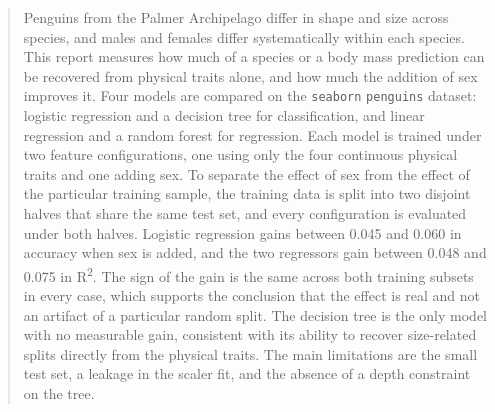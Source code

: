 \begin{abstract}
	Penguins from the Palmer Archipelago differ in shape and size across species, and males and females differ systematically within each species. This report measures how much of a species or a body mass prediction can be recovered from physical traits alone, and how much the addition of sex improves it. Four models are compared on the \texttt{seaborn} \texttt{penguins} dataset: logistic regression and a decision tree for classification, and linear regression and a random forest for regression. Each model is trained under two feature configurations, one using only the four continuous physical traits and one adding sex. To separate the effect of sex from the effect of the particular training sample, the training data is split into two disjoint halves that share the same test set, and every configuration is evaluated under both halves. Logistic regression gains between 0.045 and 0.060 in accuracy when sex is added, and the two regressors gain between 0.048 and 0.075 in R\textsuperscript{2}. The sign of the gain is the same across both training subsets in every case, which supports the conclusion that the effect is real and not an artifact of a particular random split. The decision tree is the only model with no measurable gain, consistent with its ability to recover size-related splits directly from the physical traits. The main limitations are the small test set, a leakage in the scaler fit, and the absence of a depth constraint on the tree.
\end{abstract}
